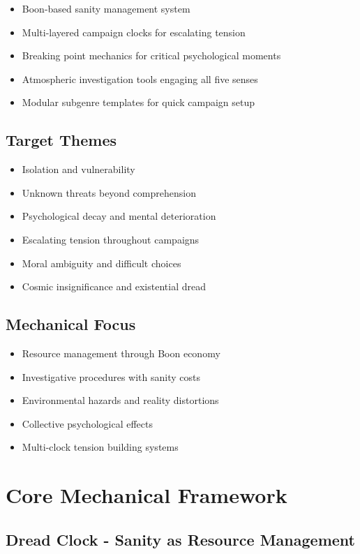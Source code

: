 \documentclass[11pt]{article}
\begin{document}
\begin{itemize}
\item Boon-based sanity management system
\item Multi-layered campaign clocks for escalating tension
\item Breaking point mechanics for critical psychological moments
\item Atmospheric investigation tools engaging all five senses
\item Modular subgenre templates for quick campaign setup
\end{itemize}

\subsection{Target Themes}

\begin{itemize}
\item Isolation and vulnerability
\item Unknown threats beyond comprehension
\item Psychological decay and mental deterioration
\item Escalating tension throughout campaigns
\item Moral ambiguity and difficult choices
\item Cosmic insignificance and existential dread
\end{itemize}

\subsection{Mechanical Focus}

\begin{itemize}
\item Resource management through Boon economy
\item Investigative procedures with sanity costs
\item Environmental hazards and reality distortions
\item Collective psychological effects
\item Multi-clock tension building systems
\end{itemize}

\section{Core Mechanical Framework}

\subsection{Dread Clock - Sanity as Resource Management}
\end{document}
